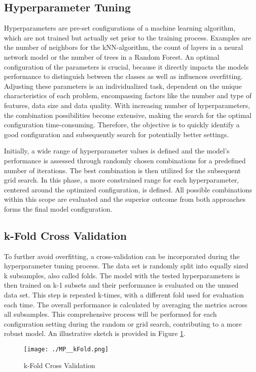 \subsection{Hyperparameter Tuning}
Hyperparameters are pre-set configurations of a machine learning algorithm, which are not trained but actually set prior to the training process. Examples are the number of neighbors for the kNN-algorithm, the count of layers in a neural network model or the number of trees in a Random Forest. An optimal configuration of the parameters is crucial, because it directly impacts the models performance to distinguish between the classes as well as influences overfitting. Adjusting these parameters is an individualized task, dependent on the unique characteristics of each problem, encompassing factors like the number and type of features, data size and data quality. With increasing number of hyperparameters, the combination possibilities become extensive, making the search for the optimal configuration time-consuming. Therefore, the objective is to quickly identify a good configuration and subsequently search for potentially better settings.

Initially, a wide range of hyperparameter values is defined and the model's performance is assessed through randomly chosen combinations for a predefined number of iterations. The best combination is then utilized for the subsequent grid search. In this phase, a more constrained range for each hyperparameter, centered around the optimized configuration, is defined. All possible combinations within this scope are evaluated and the superior outcome from both approaches forms the final model configuration. \cite[p.~465]{Python:2022} \cite{RanFor:2023}

\subsection{k-Fold Cross Validation}
To further avoid overfitting, a cross-validation can be incorporated during the hyperparameter tuning process. The data set is randomly split into equally sized k subsamples, also called folds. The model with the tested hyperparameters is then trained on k-1 subsets and their performance is evaluated on the unused data set. This step is repeated k-times, with a different fold used for evaluation each time. The overall performance is calculated by averaging the metrics across all subsamples. This comprehensive process will be performed for each configuration setting during the random or grid search, contributing to a more robust model. An illustrative sketch is provided in Figure \ref{fig:re_wholesample}. \cite[p.~470]{Python:2022}

\begin{figure}[H]
	\centering
	\texttt{[image: ./MP\_\_kFold.png]}
    \caption{k-Fold Cross Validation}
    \label{fig:re_wholesample}
\end{figure}